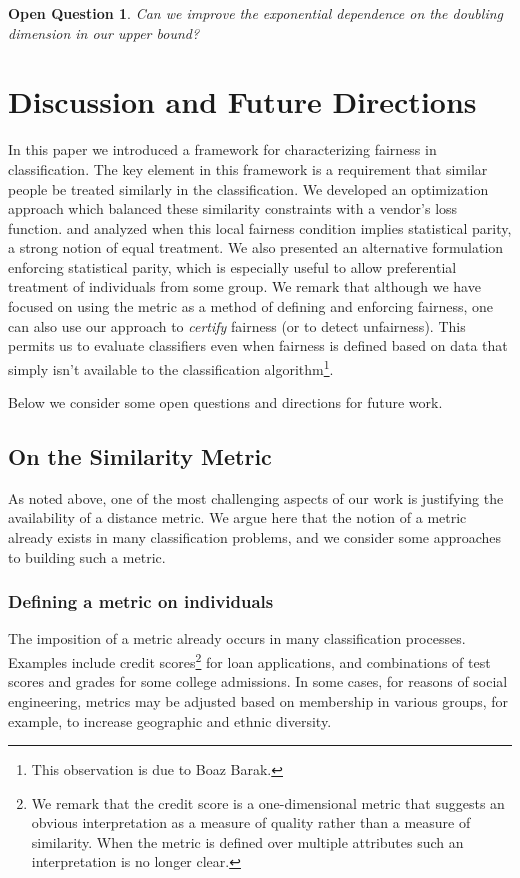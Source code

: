 \documentclass[letterpaper,11pt]{article}
\newtheorem{open}{Open Question}[section]
\theoremstyle{definition}
\begin{document}
%

\begin{open}
Can we improve the exponential dependence on the doubling dimension in our
upper bound?
\end{open}



\section{Discussion and Future Directions}
\label{sec:future}

In this paper we introduced a framework for characterizing fairness in
classification.  The key element in this framework is a requirement that
similar people be treated similarly in the classification.  We developed an
optimization approach which balanced these similarity constraints with a
vendor's loss function.  and analyzed when this local fairness condition
implies statistical parity, a strong notion of equal treatment.  We also
presented an alternative formulation enforcing statistical parity, which is
especially useful to allow preferential treatment of individuals from some
group.  We remark that although we have focused on using the metric as a
method of defining and enforcing fairness, one can also use our approach to
{\em certify} fairness (or to detect unfairness).  This permits us to evaluate
classifiers even when fairness is defined based on data that simply isn't
available to the classification algorithm\footnote{This observation is due to
Boaz Barak.}.

Below we consider some open questions and directions for future work.


\subsection{On the Similarity Metric}
\label{sec:metric}
As noted above, one of the most challenging aspects of our work is justifying
the availability of a distance metric.  We argue here that the notion of a
metric already exists in many classification problems, and we consider some
approaches to building such a metric.


\subsubsection{Defining a metric on individuals}

The imposition of a metric already occurs in many
classification processes. Examples include credit scores\footnote{We remark
that the credit score is a one-dimensional metric that suggests an obvious
interpretation as a measure of quality rather than a measure of similarity.
When the metric is defined over multiple attributes such an interpretation is
no longer clear.} for loan applications,
and combinations of test scores and grades for some college admissions.
In some cases, for reasons of social engineering, metrics may be
adjusted based on membership in various groups, for example, to
increase geographic and ethnic diversity.
\end{document}
